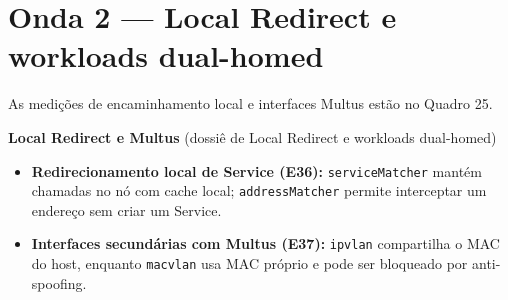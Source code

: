 \documentclass[12pt,openany,oneside,a4paper,chapter=TITLE,english,brazil]{abntex2}
\providecommand{\tightlist}{\setlength{\itemsep}{0pt}\setlength{\parskip}{0pt}}
\begin{document}
\section{Onda 2 --- Local Redirect e workloads dual-homed}\label{onda-2-local-redirect-e-workloads-dual-homed}

As medições de encaminhamento local e interfaces Multus estão no Quadro 25.

\textbf{Local Redirect e Multus} (dossiê de Local Redirect e workloads dual-homed)

\begin{itemize}
\tightlist
\item
  \textbf{Redirecionamento local de Service (E36):} \texttt{service\allowbreak{}Matcher} mantém chamadas no nó com cache local; \texttt{address\allowbreak{}Matcher} permite interceptar um endereço sem criar um Service.
\item
  \textbf{Interfaces secundárias com Multus (E37):} \texttt{ipvlan} compartilha o MAC do host, enquanto \texttt{macvlan} usa MAC próprio e pode ser bloqueado por anti-spoofing.
\end{itemize}
\end{document}
